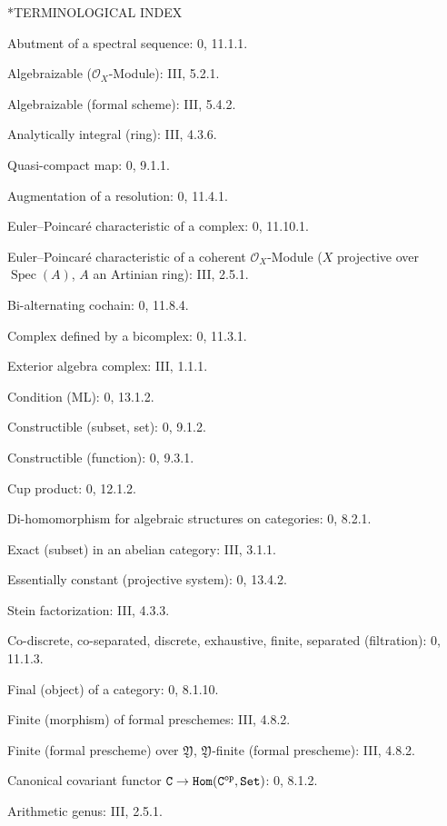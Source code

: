 \documentclass[oneside]{amsart}
\makeatletter
\theoremstyle{ega-env-style}
\theoremstyle{ega-thm-env-style}
\theoremstyle{ega-defn-env-style}
\def\section{\@startsection{section}{1}%
  \z@{.7\linespacing\@plus\linespacing}{.5\linespacing}%
  {\normalfont\bfseries\Large\scshape\centering}}
\def\mathcal{\mathscr}
\def\sh{\mathcal}                   %
\def\cat{\mathtt}                   %
\def\C{\cat{C}}                     %
\def\op{^\cat{op}}                  %
\def\Set{\cat{Set}}                 %
\def\CHom{\cat{Hom}}                %
\def\Spec{\operatorname{Spec}}
\renewcommand{\to}{\mathchoice{\longrightarrow}{\rightarrow}{\rightarrow}{\rightarrow}}
\newcommand{\oldpage}[2][]{{\marginnote{\normalfont{\textbf{#1}~|~#2}}}\ignorespaces}
\makeatother
\begin{document}
\clearpage
\oldpage[III]{163}
\section*{TERMINOLOGICAL INDEX}

\begin{flushleft}
Abutment of a spectral sequence: 0, 11.1.1.

Algebraizable ($\sh{O}_X$-Module): III, 5.2.1.

Algebraizable (formal scheme): III, 5.4.2.

Analytically integral (ring): III, 4.3.6.

Quasi-compact map: 0, 9.1.1.

Augmentation of a resolution: 0, 11.4.1.

Euler--Poincaré characteristic of a complex: 0, 11.10.1.

Euler--Poincaré characteristic of a coherent $\sh{O}_X$-Module
($X$ projective over $\Spec(A)$, $A$ an Artinian ring): III, 2.5.1.

Bi-alternating cochain: 0, 11.8.4.

Complex defined by a bicomplex: 0, 11.3.1.

Exterior algebra complex: III, 1.1.1.

Condition (ML): 0, 13.1.2.

Constructible (subset, set): 0, 9.1.2.

Constructible (function): 0, 9.3.1.

Cup product: 0, 12.1.2.

Di-homomorphism for algebraic structures on categories: 0, 8.2.1.

Exact (subset) in an abelian category: III, 3.1.1.

Essentially constant (projective system): 0, 13.4.2.

Stein factorization: III, 4.3.3.

Co-discrete, co-separated, discrete, exhaustive, finite, separated
(filtration): 0, 11.1.3.

Final (object) of a category: 0, 8.1.10.

Finite (morphism) of formal preschemes: III, 4.8.2.

Finite (formal prescheme) over $\mathfrak Y$,
$\mathfrak Y$-finite (formal prescheme): III, 4.8.2.

Canonical covariant functor $\C\to\CHom(\C\op,\Set)$: 0, 8.1.2.

Arithmetic genus: III, 2.5.1.


\end{flushleft}
\end{document}
